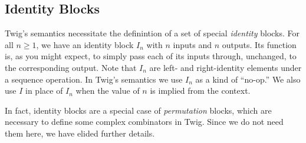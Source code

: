 \subsection{Identity Blocks}

Twig's semantics necessitate the definintion of a set of special \emph{identity} blocks. For all $n \geq 1$, we have an identity block $I_n$ with $n$ inputs and $n$ outputs. Its function is, as you might expect, to simply pass each of its inputs through, unchanged, to the corresponding output. Note that $I_n$ are left- and right-identity elements under a sequence operation. In Twig's semantics we use $I_n$ as a kind of ``no-op.'' We also use $I$ in place of $I_n$ when the value of $n$ is implied from the context.

In fact, identity blocks are a special case of \emph{permutation} blocks, which are necessary to define some complex combinators in Twig. Since we do not need them here, we have elided further details.
